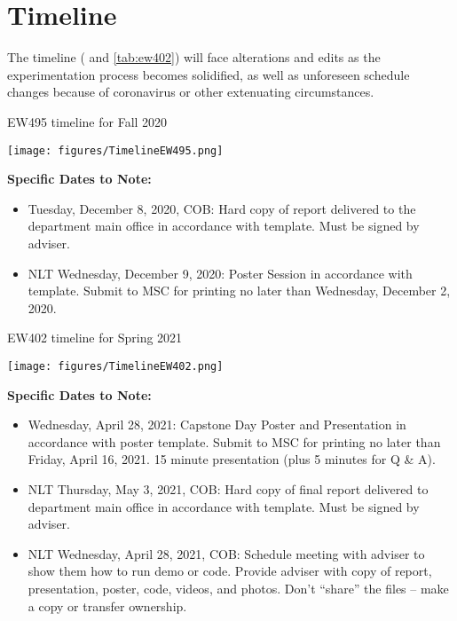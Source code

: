 \documentclass{IEEEtran}
\begin{document}


\appendices
\section{Timeline}
\label{app:A}
The timeline ( and \ref{tab:ew402}) will face alterations and edits as the experimentation process becomes solidified, as well as unforeseen schedule changes because of coronavirus or other extenuating circumstances.

\begin{table*}
\caption{EW495 timeline for Fall 2020}
\label{tab:ew495}
\begin{center}
\texttt{[image: figures/TimelineEW495.png]}
\end{center}
\noindent\textbf{Specific Dates to Note:}
\begin{itemize}
\item Tuesday, December 8, 2020, COB:  Hard copy of report delivered to the department main office in accordance with template. Must be signed by adviser. 
\item NLT Wednesday, December 9, 2020: Poster Session in accordance with template.  Submit to MSC for printing no later than Wednesday, December 2, 2020.
\end{itemize}
\end{table*}

\begin{table*}
\caption{EW402 timeline for Spring 2021}
\label{tab:ew402}
\begin{center}
\texttt{[image: figures/TimelineEW402.png]}
\end{center}
\noindent\textbf{Specific Dates to Note:}
\begin{itemize}
\item Wednesday, April 28, 2021:  Capstone Day Poster and Presentation in accordance with poster template.  Submit to MSC for printing no later than Friday, April 16, 2021.  15 minute presentation (plus 5 minutes for Q \& A). 
\item NLT Thursday, May 3, 2021, COB:  Hard copy of final report delivered to department main office in accordance with template. Must be signed by adviser. 
\item NLT Wednesday, April 28, 2021, COB:  Schedule meeting with adviser to show them how to run demo or code. Provide adviser with copy of report, presentation, poster, code, videos, and photos.   Don’t ``share'' the files -- make a copy or transfer ownership.  
\end{itemize}
\end{table*}
\end{document}
